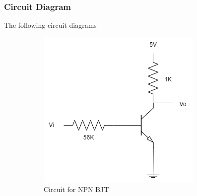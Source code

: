     \subsubsection{Circuit Diagram}
        The following circuit diagrams 
        \begin{figure}[H]
            \centering
            \begin{subfigure}{0.4\textwidth}
                \includegraphics[width=1\linewidth]{Experiment_05/Circuits/Lab5a.png}
                \caption{Circuit for NPN BJT}
                \label{cir:5NPN}
            \end{subfigure}
            \begin{subfigure}{0.4\textwidth}

\end{subfigure}
\end{figure}
